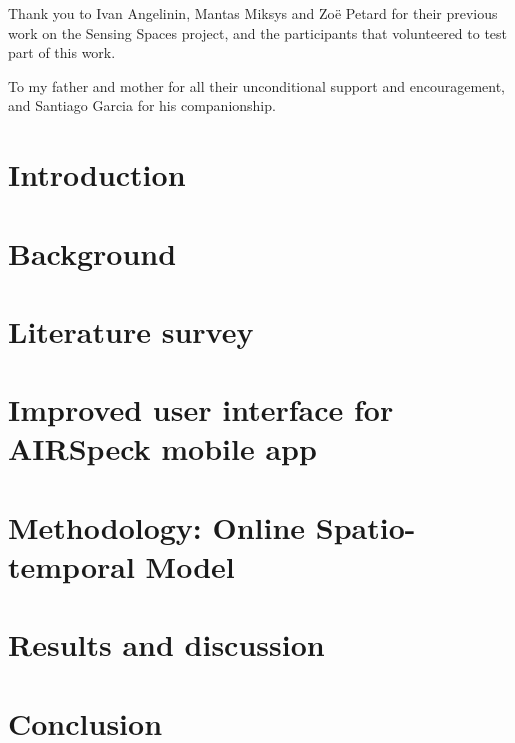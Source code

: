 \documentclass[bsc,frontabs,singlespacing,parskip,deptreport]{infthesis}
\begin{document}
Thank you to Ivan Angelinin, Mantas Miksys and Zo\"e Petard for their previous work on the Sensing Spaces project, and the participants that volunteered to test part of this work.

To my father and mother for all their unconditional support and encouragement, and Santiago Garcia for his companionship.

\tableofcontents


\chapter{Introduction}


\chapter{Background}


\chapter{Literature survey}


\chapter{Improved user interface for AIRSpeck mobile app}


\chapter{Methodology: Online Spatio-temporal Model}


\chapter{Results and discussion}


\chapter{Conclusion}







\appendix
\chapter{}

\end{document}
